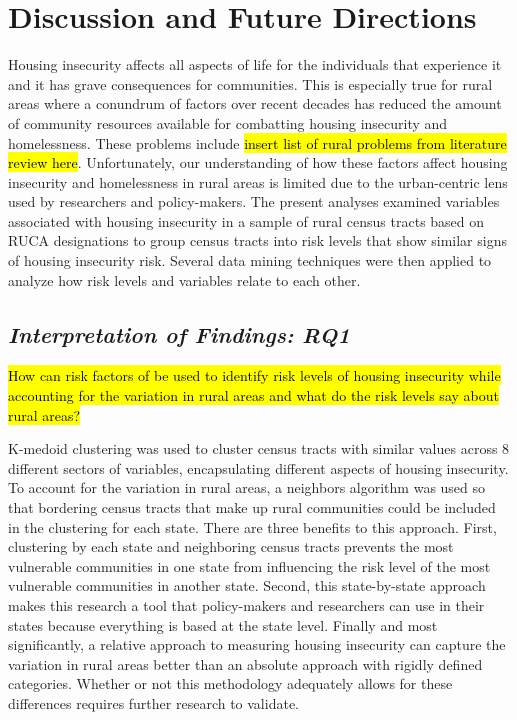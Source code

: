 \chapter{Discussion and Future Directions}	

Housing insecurity affects all aspects of life for the individuals that experience it and it has grave consequences for communities. This is especially true for rural areas where a conundrum of factors over recent decades has reduced the amount of community resources available for combatting housing insecurity and homelessness. These problems include \hl{insert list of rural problems from literature review here}. Unfortunately, our understanding of how these factors affect housing insecurity and homelessness in rural areas is limited due to the urban-centric lens used by researchers and policy-makers. The present analyses examined variables associated with housing insecurity in a sample of rural census tracts based on RUCA designations to group census tracts into risk levels that show similar signs of housing insecurity risk. Several data mining techniques were then applied to analyze how risk levels and variables relate to each other.

\section{\textit{Interpretation of Findings: RQ1}}

\hl{How can risk factors of be used to identify risk levels of housing insecurity while accounting for the variation in rural areas and what do the risk levels say about rural areas?}

K-medoid clustering was used to cluster census tracts with similar values across 8 different sectors of variables, encapsulating different aspects of housing insecurity. To account for the variation in rural areas, a neighbors algorithm was used so that bordering census tracts that make up rural communities could be included in the clustering for each state. There are three benefits to this approach. First, clustering by each state and neighboring census tracts prevents the most vulnerable communities in one state from influencing the risk level of the most vulnerable communities in another state. Second, this state-by-state approach makes this research a tool that policy-makers and researchers can use in their states because everything is based at the state level. Finally and most significantly, a relative approach to measuring housing insecurity can capture the variation in rural areas better than an absolute approach with rigidly defined categories. Whether or not this methodology adequately allows for these differences requires further research to validate. 


